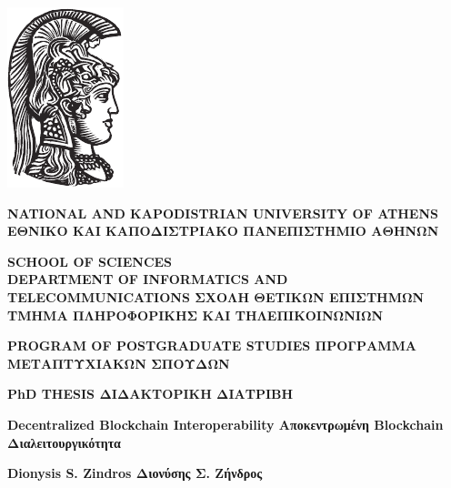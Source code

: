 \ifuniversity
 \begin{center}
 \includegraphics{chapters/preface/figures/athena-black}
 \end{center}
 \begin{minipage}[t]{\textwidth}
     \begin{center}
       {\large \bfseries
       \ifenglishfrontpage
         NATIONAL AND KAPODISTRIAN UNIVERSITY OF ATHENS
       \else
         ΕΘΝΙΚΟ ΚΑΙ ΚΑΠΟΔΙΣΤΡΙΑΚΟ ΠΑΝΕΠΙΣΤΗΜΙΟ ΑΘΗΝΩΝ
       \fi
       }
       \linebreak

       {\bfseries
       \ifenglishfrontpage
         SCHOOL OF SCIENCES \\ DEPARTMENT OF INFORMATICS AND TELECOMMUNICATIONS
       \else
         ΣΧΟΛΗ ΘΕΤΙΚΩΝ ΕΠΙΣΤΗΜΩΝ \\ ΤΜΗΜΑ  ΠΛΗΡΟΦΟΡΙΚΗΣ ΚΑΙ ΤΗΛΕΠΙΚΟΙΝΩΝΙΩΝ
       \fi
       }
       \linebreak

       {\bfseries
       \ifenglishfrontpage
         PROGRAM OF POSTGRADUATE STUDIES
       \else
         ΠΡΟΓΡΑΜΜΑ  ΜΕΤΑΠΤΥΧΙΑΚΩΝ ΣΠΟΥΔΩΝ
       \fi}
       \linebreak\linebreak\linebreak
       \linebreak\linebreak\linebreak

       {\bfseries
       \ifenglishfrontpage
         PhD THESIS
       \else
         ΔΙΔΑΚΤΟΡΙΚΗ ΔΙΑΤΡΙΒΗ
       \fi}
       \linebreak\linebreak\linebreak

       {\Large \bfseries
       \ifenglishfrontpage
         Decentralized Blockchain Interoperability
       \else
         Αποκεντρωμένη Blockchain Διαλειτουργικότητα
       \fi}
       \linebreak\linebreak\linebreak

       {\bfseries
       \ifenglishfrontpage
       Dionysis S. Zindros
     \else
       Διονύσης Σ. Ζήνδρος
     \fi}
     \end{center}
 \end{minipage}
